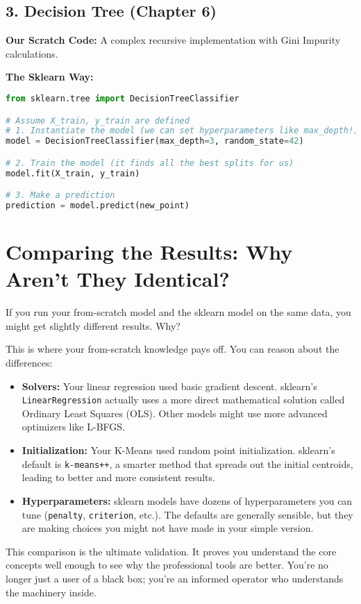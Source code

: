 \documentclass[11pt, letterpaper, openany]{book}
\begin{document}
\subsection{3. Decision Tree (Chapter 6)}

\textbf{Our Scratch Code:} A complex recursive implementation with Gini Impurity calculations.

\textbf{The Sklearn Way:}
\begin{lstlisting}[language=Python]
from sklearn.tree import DecisionTreeClassifier

# Assume X_train, y_train are defined
# 1. Instantiate the model (we can set hyperparameters like max_depth!)
model = DecisionTreeClassifier(max_depth=3, random_state=42)

# 2. Train the model (it finds all the best splits for us)
model.fit(X_train, y_train)

# 3. Make a prediction
prediction = model.predict(new_point)
\end{lstlisting}

\section{Comparing the Results: Why Aren't They Identical?}

If you run your from-scratch model and the sklearn model on the same data, you might get slightly different results. Why?

This is where your from-scratch knowledge pays off. You can reason about the differences:
\begin{itemize}
    \item \textbf{Solvers:} Your linear regression used basic gradient descent. sklearn's \texttt{LinearRegression} actually uses a more direct mathematical solution called Ordinary Least Squares (OLS). Other models might use more advanced optimizers like L-BFGS.
    \item \textbf{Initialization:} Your K-Means used random point initialization. sklearn's default is \texttt{k-means++}, a smarter method that spreads out the initial centroids, leading to better and more consistent results.
    \item \textbf{Hyperparameters:} sklearn models have dozens of hyperparameters you can tune (\texttt{penalty}, \texttt{criterion}, etc.). The defaults are generally sensible, but they are making choices you might not have made in your simple version.
\end{itemize}
This comparison is the ultimate validation. It proves you understand the core concepts well enough to see why the professional tools are better. You're no longer just a user of a black box; you're an informed operator who understands the machinery inside.
\end{document}
